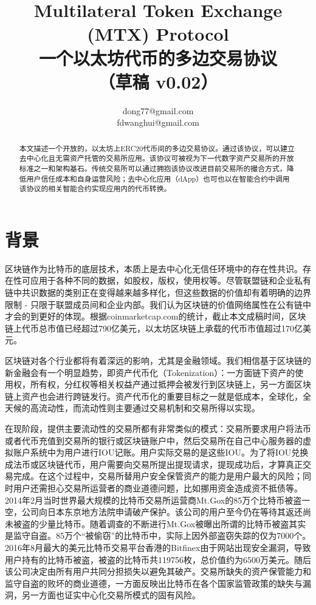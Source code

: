 \documentclass[UTF8,nofonts]{ctexart}
\title{Multilateral Token Exchange (MTX) Protocol\\一个以太坊代币的多边交易协议\\（草稿 v0.02）}
\author{ 
    dong77@gmail.com\\
    fdwanghui@gmail.com    %
}
\begin{document}
\maketitle

\begin{abstract}
本文描述一个开放的，以太坊上ERC20代币间的多边交易协议。通过该协议，可以建立去中心化且无需资产托管的交易所应用。该协议可被视为下一代数字资产交易所的开放标准之一和架构基石。传统交易所可以通过拥抱该协议改进目前交易所的撮合方式，降低用户信任成本和自身运营风险；去中心化应用（dApp）也可也以在智能合约中调用该协议的相关智能合约实现应用内的代币转换。

\end{abstract}

\newpage

\tableofcontents
\newpage

\section{背景\label{sec:background}}

区块链作为比特币的底层技术，本质上是去中心化无信任环境中的存在性共识。存在性可应用于各种不同的数据，如股权，版权，使用权等。尽管联盟链和企业私有链中共识数据的类别正在变得越来越多样化，但这些数据的价值却有着明确的边界限制 - 只限于联盟成员间和企业内部。我们认为区块链的价值网络属性在公有链中才会的到更好的体现。根据coinmarketcap.com的统计，截止本文成稿时间，区块链上代币总市值已经超过790亿美元，以太坊区块链上承载的代币市值超过170亿美元。

区块链对各个行业都将有着深远的影响，尤其是金融领域。我们相信基于区块链的新金融会有一个明显趋势，即资产代币化（Tokenization）：一方面链下资产的使用权，所有权，分红权等相关权益产通过抵押会被发行到区块链上，另一方面区块链上资产也会进行跨链发行。资产代币化的重要目标之一就是低成本，全球化，全天候的高流动性，而流动性则主要通过交易机制和交易所得以实现。

在现阶段，提供主要流动性的交易所都有非常类似的模式：交易所要求用户将法币或者代币充值到交易所的银行或区块链账户中，然后交易所在自己中心服务器的虚拟账户系统中为用户进行IOU记账。用户实际交易的是这些IOU。为了将IOU兑换成法币或区块链代币，用户需要向交易所提出提现请求，提现成功后，才算真正交易完成。在这个过程中，交易所替用户安全保管资产的能力是用户最大的风险；同时用户还需担心交易所运营者的商业道德问题，比如挪用资金造成资不抵债等。2014年2月当时世界最大规模的比特币交易所运营商Mt.Gox的85万个比特币被盗一空，公司向日本东京地方法院申请破产保护。该公司的用户至今仍在等待其返还尚未被盗的少量比特币。随着调查的不断进行Mt.Gox被曝出所谓的比特币被盗其实是监守自盗。85万个“被偷窃”的比特币中，实际上因外部盗窃失踪的仅为7000个。2016年8月最大的美元比特币交易平台香港的Bitfinex由于网站出现安全漏洞，导致用户持有的比特币被盗，被盗的比特币共119756枚，总价值约为6500万美元。随后该公司决定由所有用户共同分担损失以避免其破产。交易所缺失的资产保管能力和监守自盗的败坏的商业道德，一方面反映出比特币在各个国家监管政策的缺失与漏洞，另一方面也证实中心化交易所模式的固有风险。
\end{document}

